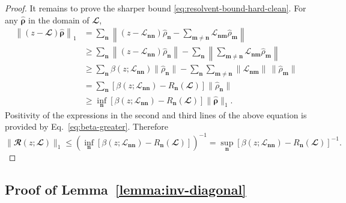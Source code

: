 \documentclass{SciPost}
\begin{document}
\begin{proof}
It remains to prove the sharper bound \eqref{eq:resolvent-bound-hard-clean}. For any \(\hat{\bm\rho}\) in the domain of \(\mathbfcal L\),
\begin{equation}
    \begin{aligned}
        \left \|(z-\mathbfcal L)\hat{\bm\rho} \right \|_1
        &=
        \sum_{\bm n}
        \left\|
        (z-\mathcal L_{\bm n\bm n})\hat\rho_{\bm n}
        -
        \sum_{\bm m\ne \bm n}
        \mathcal L_{\bm n\bm m}\hat\rho_{\bm m}
        \right\|
        \\
        &\geqslant
        \sum_{\bm n}
        \left \|(z-\mathcal L_{\bm n\bm n})\hat\rho_{\bm n}\right \|
        -
        \sum_{\bm n}
        \left\|
        \sum_{\bm m\ne \bm n}
        \mathcal L_{\bm n\bm m}\hat\rho_{\bm m}
        \right\|
        \\
        &\geqslant
        \sum_{\bm n}
        \beta(z;\mathcal L_{\bm{nn}})\|\hat\rho_{\bm n}\|
        -
        \sum_{\bm n}\sum_{\bm m\ne \bm n}
        \|\mathcal L_{\bm n\bm m}\|\,\|\hat\rho_{\bm m}\|
        \\
        &=
        \sum_{\bm n}
        \left[
            \beta(z;\mathcal L_{\bm{nn}})
            -R_{\bm n}(\mathbfcal L)
        \right]
        \|\hat\rho_{\bm n}\|
        \\
        &\geqslant
        \inf_{\bm n}
        \left[
            \beta(z;\mathcal L_{\bm{nn}})
            -R_{\bm n}(\mathbfcal L)
        \right]
        \|\hat{\bm\rho}\|_1.
    \end{aligned}
\end{equation}
Positivity of the expressions in the second and third lines of the above equation is provided by Eq.~\eqref{eq:beta-greater}.
Therefore
\begin{equation}
    \|\mathbfcal R(z;\mathbfcal L)\|_1
    \leqslant
    \left(
    \inf_{\bm n}
    \left[
        \beta(z;\mathcal L_{\bm{nn}})
        -R_{\bm n}(\mathbfcal L)
    \right]
    \right)^{-1}
    =
    \sup_{\bm n}
    \left[
        \beta(z;\mathcal L_{\bm{nn}})
        -R_{\bm n}(\mathbfcal L)
    \right]^{-1}.
\end{equation}
\end{proof}



\subsection{Proof of Lemma~\ref{lemma:inv-diagonal}}
\label{sec:lemma-inv-diagonal-proof}
\end{document}
